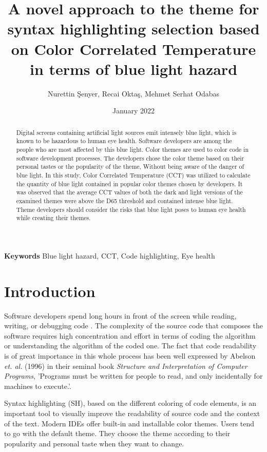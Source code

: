 \documentclass{article}
\title{A novel approach to the theme for syntax highlighting selection based on Color Correlated Temperature in terms of blue light hazard}
\author{Nurettin Şenyer, Recai Oktaş, Mehmet Serhat Odabas}
\date{January 2022}
\begin{document}
\maketitle

\begin{abstract}
Digital screens containing artificial light sources emit intensely blue light, which is known to be hazardous to human eye health. Software developers are among the people who are most affected by this blue light. Color themes are used to color code in software development processes. The developers chose the color theme based on their personal tastes or the popularity of the theme, Without being aware of the danger of blue light. In this study, Color Correlated Temperature (CCT) was utilized to calculate the quantity of blue light contained in popular color themes chosen by developers. It was observed that the average CCT values of both the dark and light versions of the examined themes were above the D65 threshold and contained intense blue light. Theme developers should consider the risks that blue light poses to human eye health while creating their themes.
\end{abstract}

\textbf{Keywords} Blue light hazard, CCT, Code highlighting, Eye health

\section{Introduction} \label{sec:introduction}

Software developers spend long hours in front of the screen while reading, writing, or debugging code \cite{vigliarolo2019report}. The complexity of the source code that composes the software requires high concentration and effort in terms of coding the algorithm or understanding the algorithm of the coded one.
The fact that code readability is of great importance in this whole process has been well expressed by Abelson \emph{et. al.} (1996) in their seminal book \emph{Structure and Interpretation of Computer Programs}, 'Programs must be written for people to read, and only incidentally for machines to execute.'\cite{abelson1996sicp}. 

Syntax highlighting (SH), based on the different coloring of code elements, is an important tool to visually improve the readability of source code and the context of the text. Modern IDEs offer built-in and installable color themes. Users tend to go with the default theme. They choose the theme according to their popularity and personal taste when they want to change.
\end{document}
